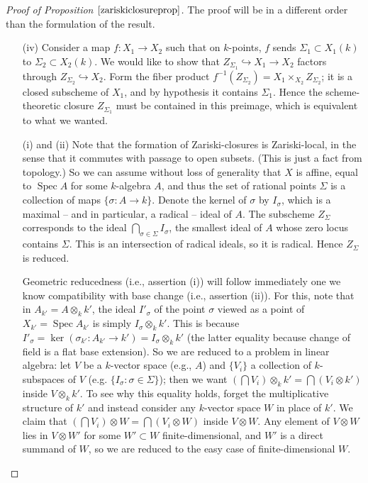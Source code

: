 \documentclass[10pt]{article}
\renewcommand{\(}{\left(}
\renewcommand{\)}{\right)}
\newcommand{\Spec}{\operatorname{Spec}}
\newcommand{\into}{\hookrightarrow}
\newcommand{\dotimes}{\displaystyle\mathop{\otimes}}
\newcommand{\dtimes}{\displaystyle\mathop{\times}}
\numberwithin{thm}{subsection}
\begin{document}
\begin{proof}[Proof of Proposition $\ref{zariskiclosureprop}$]
The proof will be in a different order than the formulation of the result.
 \begin{itemize}
\item[(iv)] Consider a map $f:X_1\to X_2$ such that on $k$-points,
$f$ sends $\Sigma_1\subset X_1(k)$
to $\Sigma_2\subset X_2(k)$.
We would like to show that $Z_{\Sigma_1}\into X_1\to X_2$
factors through $Z_{\Sigma_2}\into X_2$.
Form the fiber product $f^{-1}(Z_{\Sigma_2})=X_1\dtimes_{X_2} Z_{\Sigma_2}$;
it is a closed subscheme of $X_1$, and by hypothesis it contains $\Sigma_1$.
Hence the scheme-theoretic closure
$Z_{\Sigma_1}$ must be contained in this preimage, which is equivalent to what we wanted.
\item[(i) and (ii)] Note that the formation of Zariski-closures is Zariski-local, in the sense that it commutes with passage to open subsets. (This is just a fact from topology.) So we can assume without loss of generality that $X$ is affine, equal to $\Spec A$ for some $k$-algebra $A$,
and thus the set of rational points $\Sigma$
is a collection of maps $\{\sigma:A\to k\}$.
Denote the kernel of $\sigma$ by $I_\sigma$, which is a maximal -- and in particular, a radical -- ideal of $A$.
The subscheme $Z_\Sigma$ corresponds to the ideal $\bigcap_{\sigma\in\Sigma}I_\sigma$, the smallest ideal of $A$ whose zero locus contains $\Sigma$. This is an intersection of radical ideals, so it is radical. Hence $Z_\Sigma$ is reduced.

Geometric reducedness (i.e., assertion (i)) will follow immediately one we know compatibility with base change
(i.e., assertion (ii)). For this, note that in $A_{k'}=A\dotimes_k k'$,
the ideal $I'_\sigma$ of the point $\sigma$ viewed as a point of $X_{k'}=\Spec A_{k'}$ is simply $I_\sigma\dotimes_k k'$. This is because $I'_\sigma=\ker(\sigma_{k'}:A_{k'}\to k') = I_\sigma\dotimes_k k'$ 
(the latter equality because change of field is a flat base extension).
So we are reduced to a problem in linear algebra: let $V$ be a $k$-vector space (e.g., $A$)
and $\{V_i\}$ a collection of $k$-subspaces of $V$ (e.g. $\{I_\sigma:\sigma\in \Sigma\}$);
then we want $(\bigcap V_i)\dotimes_k k'=\bigcap(V_i\dotimes k')$ inside $V\dotimes_k k'$. 
To see why this equality holds, forget the multiplicative structure of $k'$
and instead consider any $k$-vector space $W$ in place of $k'$.  We claim that 
$(\bigcap V_i)\otimes W = \bigcap(V_i\otimes W)$ inside $V \otimes W$. Any element of $V \otimes W$ lies in
$V \otimes W'$ for some $W' \subset W$ finite-dimensional, and $W'$ is a direct summand of $W$, so 
we are reduced to the easy case of finite-dimensional $W$.


\end{itemize}
\end{proof}
\end{document}
